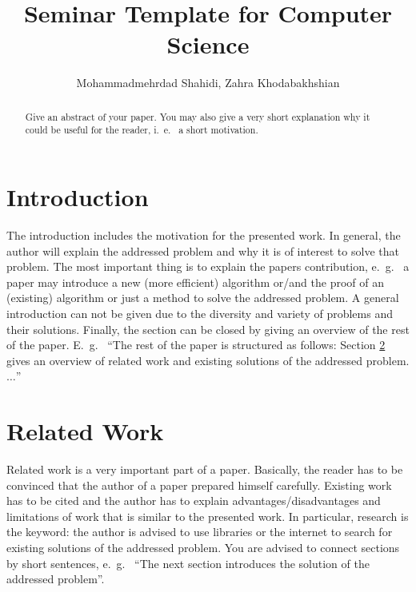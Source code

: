 \documentclass[]{rptuseminar}
\title{Seminar Template for Computer Science}
\author{ Mohammadmehrdad Shahidi, Zahra Khodabakhshian 
  \institute{Technische Universität Kaiserslautern, Department of Computer Science}}
\begin{document}

\maketitle


\begin{abstract}
    Give an abstract of your paper. You may also give a very short explanation why it could be useful for the reader, i.~e.~ a short motivation.
\end{abstract}


\section{Introduction}
\label{sec:introduction}

The introduction includes the motivation for the presented work.
In general, the author will explain the addressed problem and why it is of interest to solve that problem.
The most important thing is to explain the papers contribution, e.~g.~ a paper may introduce a new (more efficient) algorithm or/and the proof of an (existing) algorithm or just a method to solve the addressed problem.
A general introduction can not be given due to the diversity and variety of problems and their solutions.
Finally, the section can be closed by giving an overview of the rest of the paper.
E.~g.~ ``The rest of the paper is structured as follows:
Section \ref{sec:relatedwork} gives an overview of related work and existing solutions of the addressed problem. $\ldots$''

\section{Related Work}
\label{sec:relatedwork}

Related work is a very important part of a paper.
Basically, the reader has to be convinced that the author of a paper prepared himself carefully.
Existing work has to be cited and the author has to explain advantages/disadvantages and limitations of work that is similar to the presented work.
In particular, research is the keyword: the author is advised to use libraries or the internet to search for existing solutions of the addressed problem.
You are advised to connect sections by short sentences, e.~g.~ ``The next section introduces the solution of the addressed problem''.
\end{document}
